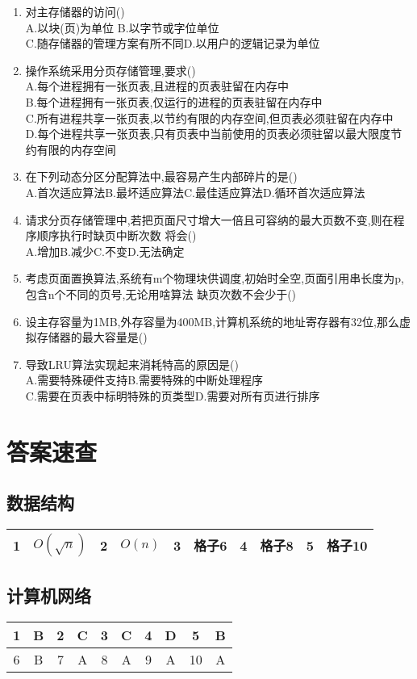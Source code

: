 \documentclass[12pt, a4paper, oneside, UTF8]{ctexbook}
\begin{document}
\begin{enumerate}
    \item 对主存储器的访问() \\
    A.以块(页)为单位 \qquad B.以字节或字位单位 \\
    C.随存储器的管理方案有所不同\qquad D.以用户的逻辑记录为单位

    \item 操作系统采用分页存储管理,要求() \\
    A.每个进程拥有一张页表,且进程的页表驻留在内存中 \\
    B.每个进程拥有一张页表,仅运行的进程的页表驻留在内存中\\
    C.所有进程共享一张页表,以节约有限的内存空间,但页表必须驻留在内存中 \\
    D.每个进程共享一张页表,只有页表中当前使用的页表必须驻留以最大限度节约有限的内存空间

    \item 在下列动态分区分配算法中,最容易产生内部碎片的是()  \\
    A.首次适应算法\qquad B.最坏适应算法\qquad C.最佳适应算法\qquad D.循环首次适应算法

    \item 请求分页存储管理中,若把页面尺寸增大一倍且可容纳的最大页数不变,则在程序顺序执行时缺页中断次数
    将会() \\
    A.增加\qquad B.减少\qquad C.不变\qquad D.无法确定

    \item 考虑页面置换算法,系统有m个物理块供调度,初始时全空,页面引用串长度为p,包含n个不同的页号,无论用啥算法
    缺页次数不会少于()

    \item 设主存容量为1MB,外存容量为400MB,计算机系统的地址寄存器有32位,那么虚拟存储器的最大容量是() 

    \item 导致LRU算法实现起来消耗特高的原因是() \\
    A.需要特殊硬件支持\qquad B.需要特殊的中断处理程序 \\
    C.需要在页表中标明特殊的页类型\qquad D.需要对所有页进行排序

\end{enumerate}

\section{答案速查} 
\subsection{数据结构}
\begin{tabular}{|*{10}{c|}}
\hline
1 & $O(\sqrt{n})$ & 2 & $O(n)$ & 3 & 格子6 & 4 & 格子8 & 5 & 格子10 \\
\hline
\end{tabular}
\subsection{计算机网络}
\begin{tabular}{|*{10}{c|}}
\hline
{\color {red} 1} & B & 2 & C & 3 & C & 4 & D & 5 & B \\
\hline
6 & B & 7 &A & 8 & A & 9 & A & 10 & A \\
\hline
\end{tabular}
\ifx\allfiles\undefined
\end{document}
